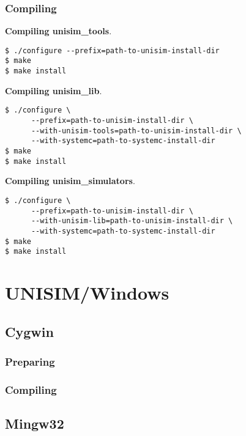 \subsubsection{Compiling}

\noindent \textbf{Compiling unisim\_tools}.

\begin{verbatim}
$ ./configure --prefix=path-to-unisim-install-dir
$ make
$ make install
\end{verbatim}

\noindent \textbf{Compiling unisim\_lib}.

\begin{verbatim}
$ ./configure \
      --prefix=path-to-unisim-install-dir \
      --with-unisim-tools=path-to-unisim-install-dir \
      --with-systemc=path-to-systemc-install-dir
$ make
$ make install
\end{verbatim}

\noindent \textbf{Compiling unisim\_simulators}.

\begin{verbatim}
$ ./configure \
      --prefix=path-to-unisim-install-dir \
      --with-unisim-lib=path-to-unisim-install-dir \
      --with-systemc=path-to-systemc-install-dir
$ make
$ make install
\end{verbatim}

\section{UNISIM/Windows}
\label{compiling_unisim_for_windows}

\subsection{Cygwin}
\label{compiling_unisim_for_cygwin}

\subsubsection{Preparing}

\subsubsection{Compiling}

\subsection{Mingw32}
\label{compiling_unisim_for_mingw32}

